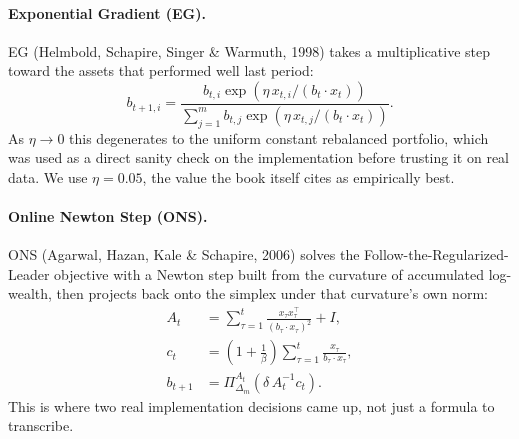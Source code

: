 \documentclass[11pt]{article}
\begin{document}
\paragraph{Exponential Gradient (EG).}
EG (Helmbold, Schapire, Singer \& Warmuth, 1998) takes a multiplicative
step toward the assets that performed well last period:
\[
    b_{t+1,i} = \frac{b_{t,i} \exp\!\left(\eta \, x_{t,i} / (b_t \cdot x_t)\right)}
                     {\sum_{j=1}^m b_{t,j} \exp\!\left(\eta \, x_{t,j} / (b_t \cdot x_t)\right)}.
\]
As $\eta \to 0$ this degenerates to the uniform constant rebalanced
portfolio, which was used as a direct sanity check on the implementation
before trusting it on real data. We use $\eta = 0.05$, the value the book
itself cites as empirically best.

\paragraph{Online Newton Step (ONS).}
\label{sec:ons}
ONS (Agarwal, Hazan, Kale \& Schapire, 2006) solves the
Follow-the-Regularized-Leader objective with a Newton step built from the
curvature of accumulated log-wealth, then projects back onto the simplex
under that curvature's own norm:
\begin{align*}
    A_t &= \sum_{\tau=1}^t \frac{x_\tau x_\tau^\top}{(b_\tau \cdot x_\tau)^2} + I, \\
    c_t &= \left(1 + \frac{1}{\beta}\right) \sum_{\tau=1}^t \frac{x_\tau}{b_\tau \cdot x_\tau}, \\
    b_{t+1} &= \Pi_{\Delta_m}^{A_t}\!\left(\delta \, A_t^{-1} c_t\right).
\end{align*}
This is where two real implementation decisions came up, not just a
formula to transcribe.
\end{document}
